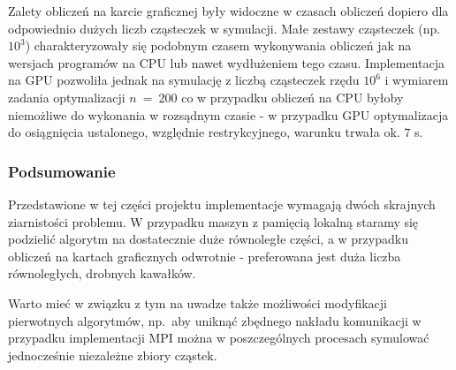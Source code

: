 \documentclass[11pt, a4paper, oneside]{article}
\begin{document}
Zalety obliczeń na karcie graficznej były widoczne w czasach obliczeń dopiero dla odpowiednio dużych liczb cząsteczek w symulacji. Małe zestawy cząsteczek (np. $10^{3}$) charakteryzowały się podobnym czasem wykonywania obliczeń jak na wersjach programów na CPU lub nawet wydłużeniem tego czasu. Implementacja na GPU pozwoliła jednak na symulację z liczbą cząsteczek rzędu $10^{6}$ i wymiarem zadania optymalizacji $n \ = \ 200$ co w przypadku obliczeń na CPU byłoby niemożliwe do wykonania w rozsądnym czasie - w przypadku GPU optymalizacja do osiągnięcia ustalonego, względnie restrykcyjnego, warunku trwała ok. $7$ s.

\subsubsection*{Podsumowanie}
Przedstawione w tej części projektu implementacje wymagają dwóch skrajnych ziarnistości problemu. W przypadku maszyn z pamięcią lokalną staramy się podzielić algorytm na dostatecznie duże równoległe części, a w przypadku obliczeń na kartach graficznych odwrotnie - preferowana jest duża liczba równoległych, drobnych kawałków.

Warto mieć w związku z tym na uwadze także możliwości modyfikacji pierwotnych algorytmów, np.~aby uniknąć zbędnego nakładu komunikacji w przypadku implementacji MPI można w poszczególnych procesach symulować jednocześnie niezależne zbiory cząstek.
\end{document}
